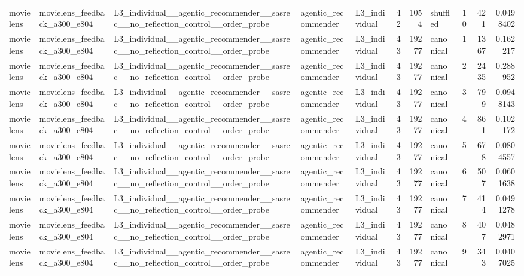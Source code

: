 \begin{table}[htbp!]
\begin{tabular}{lllllrrlrrr}
movielens & movielens\_feedback\_a300\_e804 & L3\_individual\_\_agentic\_recommender\_\_sasrec\_\_no\_reflection\_control\_\_order\_probe & agentic\_recommender & L3\_individual & 42 & 1054 & shuffled & 10 & 421 & 0.0498402 \\
movielens & movielens\_feedback\_a300\_e804 & L3\_individual\_\_agentic\_recommender\_\_sasrec\_\_no\_reflection\_control\_\_order\_probe & agentic\_recommender & L3\_individual & 43 & 19277 & canonical & 1 & 1367 & 0.162217 \\
movielens & movielens\_feedback\_a300\_e804 & L3\_individual\_\_agentic\_recommender\_\_sasrec\_\_no\_reflection\_control\_\_order\_probe & agentic\_recommender & L3\_individual & 43 & 19277 & canonical & 2 & 2435 & 0.288952 \\
movielens & movielens\_feedback\_a300\_e804 & L3\_individual\_\_agentic\_recommender\_\_sasrec\_\_no\_reflection\_control\_\_order\_probe & agentic\_recommender & L3\_individual & 43 & 19277 & canonical & 3 & 799 & 0.0948143 \\
movielens & movielens\_feedback\_a300\_e804 & L3\_individual\_\_agentic\_recommender\_\_sasrec\_\_no\_reflection\_control\_\_order\_probe & agentic\_recommender & L3\_individual & 43 & 19277 & canonical & 4 & 861 & 0.102172 \\
movielens & movielens\_feedback\_a300\_e804 & L3\_individual\_\_agentic\_recommender\_\_sasrec\_\_no\_reflection\_control\_\_order\_probe & agentic\_recommender & L3\_individual & 43 & 19277 & canonical & 5 & 678 & 0.0804557 \\
movielens & movielens\_feedback\_a300\_e804 & L3\_individual\_\_agentic\_recommender\_\_sasrec\_\_no\_reflection\_control\_\_order\_probe & agentic\_recommender & L3\_individual & 43 & 19277 & canonical & 6 & 507 & 0.0601638 \\
movielens & movielens\_feedback\_a300\_e804 & L3\_individual\_\_agentic\_recommender\_\_sasrec\_\_no\_reflection\_control\_\_order\_probe & agentic\_recommender & L3\_individual & 43 & 19277 & canonical & 7 & 414 & 0.0491278 \\
movielens & movielens\_feedback\_a300\_e804 & L3\_individual\_\_agentic\_recommender\_\_sasrec\_\_no\_reflection\_control\_\_order\_probe & agentic\_recommender & L3\_individual & 43 & 19277 & canonical & 8 & 407 & 0.0482971 \\
movielens & movielens\_feedback\_a300\_e804 & L3\_individual\_\_agentic\_recommender\_\_sasrec\_\_no\_reflection\_control\_\_order\_probe & agentic\_recommender & L3\_individual & 43 & 19277 & canonical & 9 & 343 & 0.0407025 \\

\end{tabular}
\end{table}
